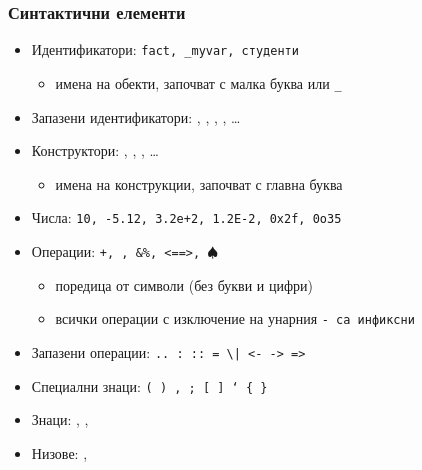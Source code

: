 \documentclass[alsotrans]{beamerswitch}
\begin{document}
\begin{frame}[fragile]
  \frametitle{Синтактични елементи}

  \begin{itemize}[<+->]
  \item Идентификатори: \tt{fact}, \tt{\_myvar}, \tt{студенти}
    \begin{itemize}
    \item имена на обекти, започват с малка буква или \tt\_
    \end{itemize}
  \item Запазени идентификатори: , , , , \ldots
  \item Конструктори: , , , \ldots
    \begin{itemize}
    \item имена на конструкции, започват с главна буква
    \end{itemize}
  \item Числа: \tt{10}, \tt{-5.12}, \tt{3.2e+2}, \tt{1.2E-2}, \tt{0x2f}, \tt{0o35}
  \item Операции: \tt+, \tt*, \tt{\&\%}, \tt{<==>}, \tt{$\spadesuit$}
    \begin{itemize}
    \item поредица от символи (без букви и цифри)
    \item всички операции с изключение на унарния \tt- са инфиксни
    \end{itemize}
  \item Запазени операции: \tt{..} \tt: \tt{::} \tt= \tt\textbackslash \tt| \tt{<-} \tt{->} \tt@ \tt\~ \tt{=>}
  \item Специални знаци: \tt( \tt) \tt, \tt; \tt[ \tt] \tt` \tt\{ \tt\}
  \item Знаци: , , 
  \item Низове: , 
  \end{itemize}
\end{frame}
\end{document}
